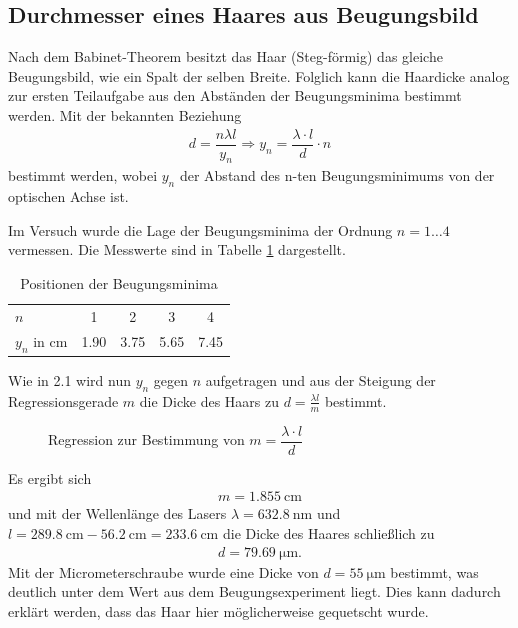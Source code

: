 \documentclass[ngerman, parskip*]{scrartcl}
\begin{document}

\subsection{Durchmesser eines Haares aus Beugungsbild}

Nach dem Babinet-Theorem besitzt das Haar (Steg-förmig) das gleiche Beugungsbild, wie ein Spalt der selben Breite. Folglich kann die Haardicke analog zur ersten Teilaufgabe aus den Abständen der Beugungsminima bestimmt werden. Mit der bekannten Beziehung
\begin{align*}
  d = \dfrac{n\lambda l}{y_n} \Rightarrow y_n = \dfrac{\lambda \cdot l}{d}\cdot n
\end{align*}
bestimmt werden, wobei $y_n$ der Abstand des n-ten Beugungsminimums von der optischen Achse ist. 

Im Versuch wurde die Lage der Beugungsminima der Ordnung $n=1\dots 4$ vermessen. Die Messwerte sind in Tabelle \ref{table:2_4} dargestellt. 

\begin{table}[!h]
\centering
\caption{Positionen der Beugungsminima}
\begin{tabular}{l|cccc}
\toprule
$n$ & 1 & 2 & 3 & 4 \\ 
$y_n$ in $\si{\cm}$ & 1.90 & 3.75 & 5.65 & 7.45 \\ 
\bottomrule
\end{tabular}
\label{table:2_4}
\end{table}

Wie in 2.1 wird nun $y_n$ gegen $n$ aufgetragen und aus der Steigung der Regressionsgerade $m$ die Dicke des Haars zu $d = \frac{\lambda l}{m}$ bestimmt.

\begin{figure}
  \centering
  \caption{Regression zur Bestimmung von $m = \dfrac{\lambda \cdot l}{d}$ }
  
\end{figure}

Es ergibt sich 
\begin{align*}
  m = \SI {1,855}{\cm}
\end{align*}
und mit der Wellenlänge des Lasers $\lambda = \SI{632,8}{\nano\meter}$ und $l = \SI{289,8}{\cm} - \SI{56,2}{\cm} = \SI{233,6}{\cm}$ die Dicke des Haares schließlich zu
\begin{align*}
  d = \SI{79,69}{\micro\meter}.
\end{align*}
Mit der Micrometerschraube wurde eine Dicke von $d = \SI{55}{\micro\meter}$ bestimmt, was deutlich unter dem Wert aus dem Beugungsexperiment liegt. Dies kann dadurch erklärt werden, dass das Haar hier möglicherweise gequetscht wurde. 
\end{document}
